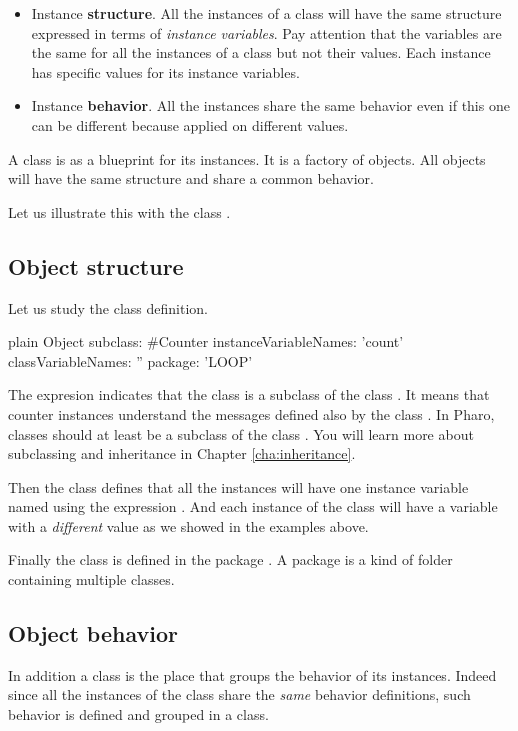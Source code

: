 \documentclass[10pt,twoside,english]{_support/latex/sbabook/sbabook}
\begin{document}
\begin{itemize}
\item Instance \textbf{structure}. All the instances of a class will have the same structure expressed in terms of \textit{instance variables}. Pay attention that the variables are the same for all the instances of a class but not their values. Each instance has specific values for its instance variables.
\item Instance \textbf{behavior}. All the instances share the same behavior even if this one can be different because applied on different values. 
\end{itemize}

\begin{important}
A class is as a blueprint for its instances. It is a factory of objects. All objects will have the same structure and share a common behavior. 
\end{important}

Let us illustrate this with the class .
\subsection{Object structure}
Let us study the  class definition.  

\begin{displaycode}{plain}
Object subclass: #Counter
	instanceVariableNames: 'count'
	classVariableNames: ''
	package: 'LOOP'
\end{displaycode}

The expresion  indicates that the class  is a subclass of the class .
It means that counter instances understand the messages defined also by the class . In Pharo, classes should at least be a subclass of the class . You will learn more about subclassing and inheritance in Chapter \ref{cha:inheritance}.

Then the class  defines that all the instances will have one instance variable named  using the expression . And each instance of the class  will have a  variable with a \textit{different} value as we showed in the examples above.

Finally the class is defined in the package . A package is a kind of folder containing multiple classes. 
\subsection{Object behavior}
In addition a class is the place that groups the behavior of its instances. Indeed since all the instances of the class share the \textit{same} behavior definitions, such behavior is defined and grouped in a class.
\end{document}
